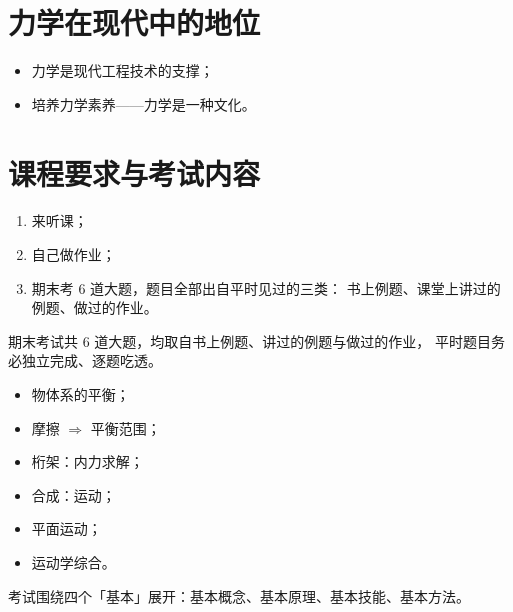 \section{力学在现代中的地位}

\begin{itemize}
  \item 力学是现代工程技术的支撑；
  \item 培养力学素养——力学是一种文化。
\end{itemize}

\section{课程要求与考试内容}

\begin{enumerate}
  \item 来听课；
  \item 自己做作业；
  \item 期末考 6 道大题，题目全部出自平时见过的三类：
    书上例题、课堂上讲过的例题、做过的作业。
\end{enumerate}

\begin{warnbox}
期末考试共 6 道大题，均取自书上例题、讲过的例题与做过的作业，
平时题目务必独立完成、逐题吃透。
\end{warnbox}

\begin{itemize}
  \item 物体系的平衡；
  \item 摩擦 $\Rightarrow$ 平衡范围；
  \item 桁架：内力求解；
  \item 合成：运动；
  \item 平面运动；
  \item 运动学综合。
\end{itemize}

考试围绕四个「基本」展开：基本概念、基本原理、基本技能、基本方法。
